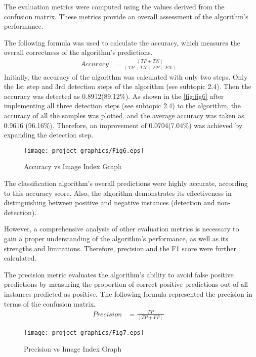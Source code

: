 \documentclass[]{iat}
\begin{document}
The evaluation metrics were computed using the values derived from the confusion matrix. These metrics provide an overall assessment of the algorithm's performance. 
\par
The following formula was used to calculate the accuracy, which measures the overall correctness of the algorithm's predictions.
\FloatBarrier
\begin{align}
Accuracy &=\frac{(TP+TN)}{(TP+TN+FP+FN)}
\end{align}
Initially, the accuracy of the algorithm was calculated with only two steps. Only the 1st step and 3rd detection steps of the algorithm (see subtopic 2.4). Then the accuracy was detected as 0.8912(89.12\%). As shown in the \autoref{fig:fig6} after implementing all three detection steps (see subtopic 2.4) to the algorithm, the accuracy of all the samples was plotted, and the average accuracy was taken as 0.9616 (96.16\%). Therefore, an improvement of 0.0704(7.04\%) was achieved by expanding the detection step. 
\par
\FloatBarrier
\begin{figure}[h]
	\texttt{[image: project\_graphics/Fig6.eps]}
	\caption{Accuracy vs Image Index Graph}
	\label{fig:fig6}
\end{figure}
\par
The classification algorithm's overall predictions were highly accurate, according to this accuracy score. Also, the algorithm demonstrates its effectiveness in distinguishing between positive and negative instances (detection and non-detection).
\par
However, a comprehensive analysis of other evaluation metrics is necessary to gain a proper understanding of the algorithm's performance, as well as its strengths and limitations. Therefore, precision and the F1 score were further calculated.
\par
The precision metric evaluates the algorithm's ability to avoid false positive predictions by measuring the proportion of correct positive predictions out of all instances predicted as positive. The following formula represented the precision in terms of the confusion matrix.
\FloatBarrier
\begin{align}
Precision &=\frac{TP}{(TP+FP)}
\end{align}
\par
\FloatBarrier
\begin{figure}[h]
    
	\texttt{[image: project\_graphics/Fig7.eps]}
	\caption{Precision vs Image Index Graph}
	\label{fig:fig7}
\end{figure}
\end{document}
